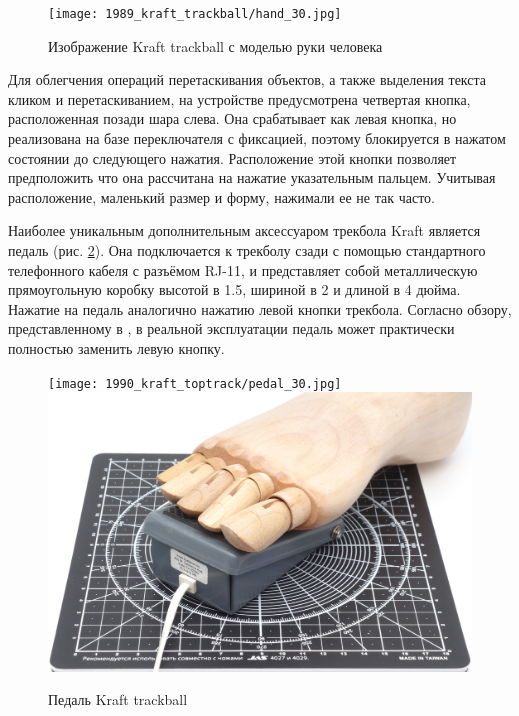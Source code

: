 \documentclass[11pt, a4paper]{article}
\begin{document}
\begin{figure}[h]
    \centering
    \texttt{[image: 1989\_kraft\_trackball/hand\_30.jpg]}
    \caption{Изображение Kraft trackball с моделью руки человека}
    \label{fig:KraftHand}
\end{figure}

Для облегчения операций перетаскивания объектов, а также выделения текста кликом и перетаскиванием, на устройстве предусмотрена четвертая кнопка, расположенная позади шара слева. Она срабатывает как левая кнопка, но реализована на базе переключателя с фиксацией, поэтому блокируется в нажатом состоянии до следующего нажатия. Расположение этой кнопки позволяет предположить что она рассчитана на нажатие указательным пальцем. Учитывая расположение, маленький размер и форму, нажимали ее не так часто.

Наиболее уникальным дополнительным аксессуаром трекбола Kraft является педаль (рис. \ref{fig:KraftPedal}). Она подключается к трекболу сзади с помощью стандартного телефонного кабеля с разъёмом RJ-11, и представляет собой металлическую прямоугольную коробку высотой в 1.5, шириной в 2 и длиной в 4 дюйма. Нажатие на педаль аналогично нажатию левой кнопки трекбола. Согласно обзору, представленному в \cite{kraftwithpedal}, в реальной эксплуатации педаль может практически полностью заменить левую кнопку.

\begin{figure}[h]
    \centering
    \texttt{[image: 1990\_kraft\_toptrack/pedal\_30.jpg]} \hfill 
    \includegraphics[scale=0.22]{1990_kraft_toptrack/pedal_foot_30.jpg}
    \caption{Педаль Kraft trackball}
    \label{fig:KraftPedal}
\end{figure}
\end{document}
